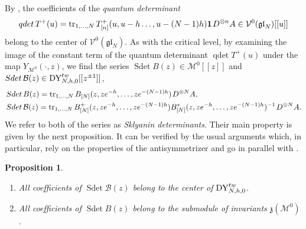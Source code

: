 \documentclass[12pt,a4paper,reqno]{amsart}
\theoremstyle{stil}
\theoremstyle{defi}
\theoremstyle{defi}
\theoremstyle{stil}
\newtheorem{pro}[thm]{Proposition}
\theoremstyle{stil}
\theoremstyle{stil}
\theoremstyle{prim}
\newcommand{\ot}{\otimes}
\newcommand{\ts}{\hspace{1pt}}
\newcommand{\dyhoz}{{\rm DY}_{N,h,0}^{tw}  }
\newcommand{\Mcz}{\mathcal{M}^{0} }
\newcommand{\vac}{ \mathrm{\boldsymbol{1}}}
\newcommand{\tr}{ {\rm tr}}
\newcommand{\Vcz}{\mathcal{V}^{0}(\mathfrak{gl}_N)}
\begin{document}
By \cite[Prop. 3.10]{KM}, the coefficients of the {\em quantum determinant}
$$
\mathop{qdet} T^+(u)=
\tr_{1,\ldots ,N} \, T_{[n]}^+ (u ,u-h\ldots ,u -(N-1)h)\vac \ts D^{\ot n}  A \in \Vcz [[u]]
$$
belong to the center of $\Vcz$. As with the critical level, by examining the image of the constant term of the quantum determinant $\mathop{qdet} T^+(u)$ under the map
$Y_{\Mcz }(\cdot , z)$, we find the series
$\mathop{Sdet} B(z)\in \Mcz [[z ]]$ and $\mathop{Sdet}\mathcal{B} (z)\in \dyhoz[[z^{\pm 1}]]$,
\begin{align*}
&\mathop{Sdet} B(z) = \tr_{1,\ldots ,N} \, B_{[N]}( z,ze^{-  h},\ldots ,ze^{-(N-1)h} ) \ts D^{\ot N}  A,\\
&
\mathop{Sdet}\mathcal{B} (z)=
\tr_{1,\ldots ,N} \,  B^+_{[N]}( z,ze^{-  h},\ldots ,ze^{-(N-1)h} )    B^*_{[N]}( z ,ze^{-  h },\ldots ,ze^{-(N-1)h } ) ^{-1}\ts D^{\ot N}  A.
\end{align*} 
We refer to both of the series as 
{\em Sklyanin determinants}. 
Their main property is given by the next proposition. It can be verified by the usual arguments which, in particular, rely on the properties of the antisymmetrizer and go in parallel  with \cite[Sect. 4.1]{MRS}.

\begin{pro}
\begin{enumerate}
\item  All coefficients of   $\mathop{Sdet}\mathcal{B} (z)$ belong to the center of   $\dyhoz$.
\item All coefficients of   $\mathop{Sdet} B(z)$ belong to the submodule of invariants $\mathfrak{z}(\Mcz)$.
\end{enumerate}
\end{pro}

 


 
\end{document}
